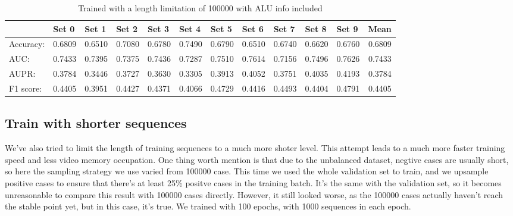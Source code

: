 \documentclass[10pt,a4paper]{article}
\begin{document}
\begin{spacing}{1.5}
		\begin{table}[H]
			\centering
			\caption{Trained with a length limitation of 100000 with ALU info included}
			\begin{tabular}{l|rrrrrrrrrr|r}
				& \multicolumn{1}{l}{Set 0} & \multicolumn{1}{l}{Set 1} & \multicolumn{1}{l}{Set 2} & \multicolumn{1}{l}{Set 3} & \multicolumn{1}{l}{Set 4} & \multicolumn{1}{l}{Set 5} & \multicolumn{1}{l}{Set 6} & \multicolumn{1}{l}{Set 7} & \multicolumn{1}{l}{Set 8} & \multicolumn{1}{l}{Set 9} & \multicolumn{1}{l}{Mean} \\ \hline \hline
				Accuracy: & 0.6809  & 0.6510  & 0.7080  & 0.6780  & 0.7490  & 0.6790  & 0.6510  & 0.6740  & 0.6620  & 0.6760  & 0.6809  \\
				AUC:  & 0.7433  & 0.7395  & 0.7375  & 0.7436  & 0.7287  & 0.7510  & 0.7614  & 0.7156  & 0.7496  & 0.7626  & 0.7433  \\
				AUPR: & 0.3784  & 0.3446  & 0.3727  & 0.3630  & 0.3305  & 0.3913  & 0.4052  & 0.3751  & 0.4035  & 0.4193  & 0.3784  \\
				F1 score: & 0.4405  & 0.3951  & 0.4427  & 0.4371  & 0.4066  & 0.4729  & 0.4416  & 0.4493  & 0.4404  & 0.4791  & 0.4405  \\
			\end{tabular}%
			\label{tab:addlabel}%
		\end{table}%
		
		\subsection{Train with shorter sequences}
		
		We've also tried to limit the length of training sequences to a much more shoter level. This attempt leads to a much more faster training speed and less video memory occupation. One thing worth mention is that due to the unbalanced dataset, negtive cases are usually short, so here the sampling strategy we use varied from 100000 case. This time we used the whole validation set to train, and we upsample positive cases to ensure that there's at least 25\% positve cases in the training batch. It's the same with the validation set, so it becomes unreasonable to compare this result with 100000 cases directly. However, it still looked worse, as the 100000 cases actually haven't reach the stable point yet, but in this case, it's true. We trained with 100 epochs, with 1000 sequences in each epoch.
		

\end{spacing}
\end{document}
